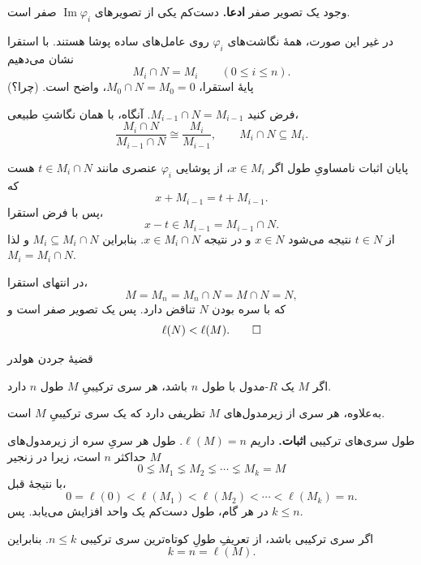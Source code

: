 \begin{frame}[t]{وجود یک تصویر صفر}
  \label{lec13:zero-image-induction}
  \textbf{ادعا.} دست‌کم یکی از تصویرهای $\operatorname{Im}\varphi_i$ صفر است.
  \par\medskip
  در غیر این صورت، همهٔ نگاشت‌های $\varphi_i$ روی عامل‌های ساده پوشا هستند.
  با استقرا نشان می‌دهیم
  \[
    M_i\cap N=M_i\qquad(0\leqslant i\leqslant n).
  \]
  پایهٔ استقرا، $M_0\cap N=M_0=0$، واضح است. \hfill(چرا؟)
  \par\medskip
  فرض کنید $M_{i-1}\cap N=M_{i-1}$. آنگاه، با همان نگاشتِ طبیعی،
  \[
    \frac{M_i\cap N}{M_{i-1}\cap N}
      \cong\frac{M_i}{M_{i-1}},
    \qquad M_i\cap N\subseteq M_i.
  \]
\end{frame}

\begin{frame}[t]{پایان اثبات نامساویِ طول}
  \label{lec13:proper-length-proof-end}
  اگر $x\in M_i$، از پوشایی $\varphi_i$ عنصری مانند $t\in M_i\cap N$ هست که
  \[
    x+M_{i-1}=t+M_{i-1}.
  \]
  پس با فرض استقرا،
  \[
    x-t\in M_{i-1}=M_{i-1}\cap N.
  \]
  از $t\in N$ نتیجه می‌شود $x\in N$ و در نتیجه $x\in M_i\cap N$.
  بنابراین $M_i\subseteq M_i\cap N$ و لذا $M_i=M_i\cap N$.
  \par\medskip
  در انتهای استقرا،
  \[
    M=M_n=M_n\cap N=M\cap N=N,
  \]
  که با سره بودن $N$ تناقض دارد. پس یک تصویر صفر است و
  \[
    \ell(N)<\ell(M).\qed
  \]
\end{frame}

\begin{frame}[t]{قضیهٔ جردن هولدر}
  \label{lec13:jordan-holder}
  \begin{theorem}
    اگر $M$ یک $R$-مدول با طول $n$ باشد، هر سری ترکیبیِ $M$ طول $n$ دارد.
    \par\medskip
    به‌علاوه، هر سری از زیرمدول‌های $M$ تظریفی دارد که یک سری ترکیبیِ $M$ است.
  \end{theorem}
\end{frame}

\begin{frame}[t]{طول سری‌های ترکیبی}
  \label{lec13:composition-length-proof}
  \textbf{اثبات.} داریم $\ell(M)=n$. طول هر سریِ سره از زیرمدول‌های $M$
  حداکثر $n$ است، زیرا در زنجیر
  \[
    0\lneq M_1\lneq M_2\lneq\cdots\lneq M_k=M
  \]
  با نتیجهٔ قبل،
  \[
    0=\ell(0)<\ell(M_1)<\ell(M_2)<\cdots<\ell(M_k)=n.
  \]
  در هر گام، طول دست‌کم یک واحد افزایش می‌یابد. پس $k\leqslant n$.
  \par\medskip
  اگر سری ترکیبی باشد، از تعریفِ طولِ کوتاه‌ترین سری ترکیبی $n\leqslant k$.
  بنابراین
  \[
    k=n=\ell(M).
  \]
\end{frame}

